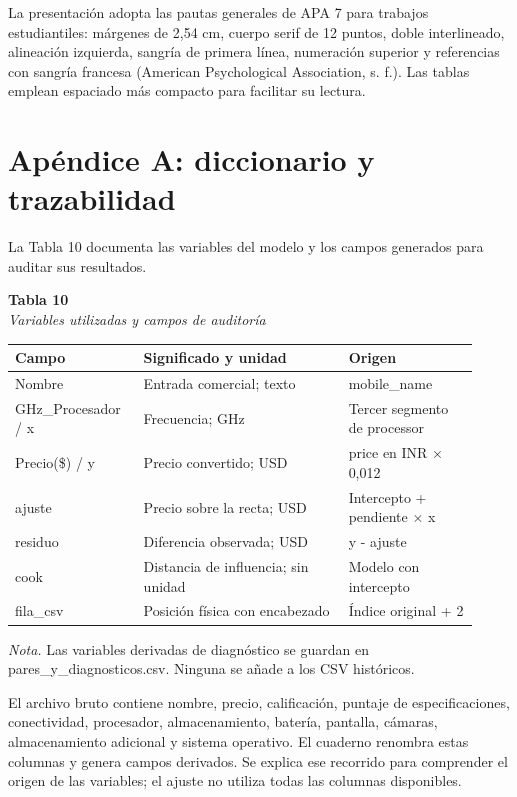 \documentclass[12pt,letterpaper]{article}
\begin{document}
La presentación adopta las pautas generales de APA 7 para trabajos estudiantiles: márgenes de 2,54 cm, cuerpo serif de 12 puntos, doble interlineado, alineación izquierda, sangría de primera línea, numeración superior y referencias con sangría francesa (American Psychological Association, s. f.). Las tablas emplean espaciado más compacto para facilitar su lectura.

\clearpage
\section*{Apéndice A: diccionario y trazabilidad}
La Tabla 10 documenta las variables del modelo y los campos generados para auditar sus resultados.

\begin{center}\begin{minipage}{\linewidth}\textbf{Tabla 10}\\\textit{Variables utilizadas y campos de auditoría}\\\begin{singlespace}\small
\begin{tabular}{@{}p{0.2457\linewidth}p{0.4124\linewidth}p{0.2650\linewidth}@{}}\toprule
\textbf{Campo} & \textbf{Significado y unidad} & \textbf{Origen}\\\midrule
Nombre & Entrada comercial; texto & mobile\_name\\
GHz\_Procesador / x & Frecuencia; GHz & Tercer segmento de processor\\
Precio(\$) / y & Precio convertido; USD & price en INR × 0,012\\
ajuste & Precio sobre la recta; USD & Intercepto + pendiente × x\\
residuo & Diferencia observada; USD & y - ajuste\\
cook & Distancia de influencia; sin unidad & Modelo con intercepto\\
fila\_csv & Posición física con encabezado & Índice original + 2\\
\bottomrule\end{tabular}\end{singlespace}
\small\textit{Nota.} Las variables derivadas de diagnóstico se guardan en pares\_y\_diagnosticos.csv. Ninguna se añade a los CSV históricos.
\end{minipage}\end{center}
El archivo bruto contiene nombre, precio, calificación, puntaje de especificaciones, conectividad, procesador, almacenamiento, batería, pantalla, cámaras, almacenamiento adicional y sistema operativo. El cuaderno renombra estas columnas y genera campos derivados. Se explica ese recorrido para comprender el origen de las variables; el ajuste no utiliza todas las columnas disponibles.
\end{document}
